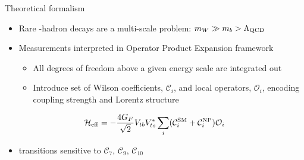 \documentclass[aspectratio=1610]{beamer}
\begin{document}
\begin{frame}{Theoretical formalism}

\begin{itemize}
  \item Rare \bquark-hadron decays are a multi-scale problem: $m_{W} \gg m_{{b}} > \Lambda_{\rm QCD}$
  \item Measurements interpreted in Operator Product Expansion framework
  \begin{itemize}
  \item[\ding{70}] All degrees of freedom above a given energy scale are integrated out
  \item[\ding{70}] Introduce set of Wilson coefficients, $\mathcal{C}_{i}$, and local operators, $\mathcal{O}_{i}$, encoding coupling strength and Lorentz structure
  \end{itemize}
\end{itemize}
\begin{equation*}
\mathcal{H}_{\rm eff} = - \frac{4G_{F}}{\sqrt{2}}V_{tb}V^{*}_{ts}\sum_{i}(\mathcal{C}_{i}^{\rm SM}+\mathcal{C}_{i}^{\rm NP})\mathcal{O}_{i}
\end{equation*}
  
\begin{itemize}
\item \btosmm transitions sensitive to $\mathcal{C}_{7}$, $\mathcal{C}_{9}$, $\mathcal{C}_{10}$
\end{itemize}

\medskip


\end{frame}
\end{document}
